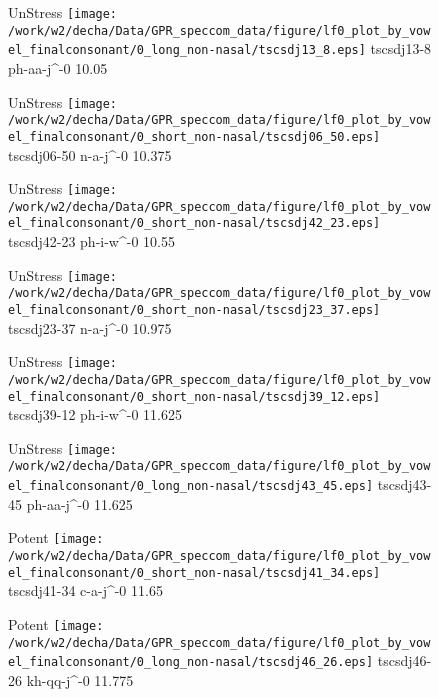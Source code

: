 \documentclass{article}
\begin{document}
\begin{figure}[t]
\begin{minipage}[b]{.24\textwidth}
UnStress
\centering
\texttt{[image: /work/w2/decha/Data/GPR\_speccom\_data/figure/lf0\_plot\_by\_vowel\_finalconsonant/0\_long\_non-nasal/tscsdj13\_8.eps]}
tscsdj13-8 ph-aa-j\textasciicircum-0 10.05
\end{minipage}
\begin{minipage}[b]{.24\textwidth}
UnStress
\centering
\texttt{[image: /work/w2/decha/Data/GPR\_speccom\_data/figure/lf0\_plot\_by\_vowel\_finalconsonant/0\_short\_non-nasal/tscsdj06\_50.eps]}
tscsdj06-50 n-a-j\textasciicircum-0 10.375
\end{minipage}
\begin{minipage}[b]{.24\textwidth}
UnStress
\centering
\texttt{[image: /work/w2/decha/Data/GPR\_speccom\_data/figure/lf0\_plot\_by\_vowel\_finalconsonant/0\_short\_non-nasal/tscsdj42\_23.eps]}
tscsdj42-23 ph-i-w\textasciicircum-0 10.55
\end{minipage}
\begin{minipage}[b]{.24\textwidth}
UnStress
\centering
\texttt{[image: /work/w2/decha/Data/GPR\_speccom\_data/figure/lf0\_plot\_by\_vowel\_finalconsonant/0\_short\_non-nasal/tscsdj23\_37.eps]}
tscsdj23-37 n-a-j\textasciicircum-0 10.975
\end{minipage}
\end{figure}

\begin{figure}[t]
\begin{minipage}[b]{.24\textwidth}
UnStress
\centering
\texttt{[image: /work/w2/decha/Data/GPR\_speccom\_data/figure/lf0\_plot\_by\_vowel\_finalconsonant/0\_short\_non-nasal/tscsdj39\_12.eps]}
tscsdj39-12 ph-i-w\textasciicircum-0 11.625
\end{minipage}
\begin{minipage}[b]{.24\textwidth}
UnStress
\centering
\texttt{[image: /work/w2/decha/Data/GPR\_speccom\_data/figure/lf0\_plot\_by\_vowel\_finalconsonant/0\_long\_non-nasal/tscsdj43\_45.eps]}
tscsdj43-45 ph-aa-j\textasciicircum-0 11.625
\end{minipage}
\begin{minipage}[b]{.24\textwidth}
\colorbox{Apricot}{Potent}
\centering
\texttt{[image: /work/w2/decha/Data/GPR\_speccom\_data/figure/lf0\_plot\_by\_vowel\_finalconsonant/0\_short\_non-nasal/tscsdj41\_34.eps]}
tscsdj41-34 c-a-j\textasciicircum-0 11.65
\end{minipage}
\begin{minipage}[b]{.24\textwidth}
\colorbox{Apricot}{Potent}
\centering
\texttt{[image: /work/w2/decha/Data/GPR\_speccom\_data/figure/lf0\_plot\_by\_vowel\_finalconsonant/0\_long\_non-nasal/tscsdj46\_26.eps]}
tscsdj46-26 kh-qq-j\textasciicircum-0 11.775
\end{minipage}
\end{figure}
\end{document}
